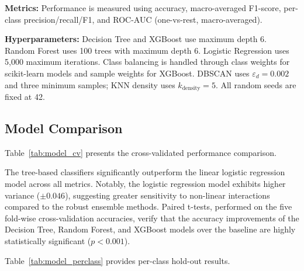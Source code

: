 \documentclass[conference]{IEEEtran}
\begin{document}
\textbf{Metrics:} Performance is measured using accuracy, macro-averaged F1-score, per-class precision/recall/F1, and ROC-AUC (one-vs-rest, macro-averaged).

\textbf{Hyperparameters:} Decision Tree and XGBoost use maximum depth 6. Random Forest uses 100 trees with maximum depth 6. Logistic Regression uses 5,000 maximum iterations. Class balancing is handled through class weights for scikit-learn models and sample weights for XGBoost. DBSCAN uses $\varepsilon_d=0.002$ and three minimum samples; KNN density uses $k_{\text{density}}=5$. All random seeds are fixed at 42.

\subsection{Model Comparison}

Table~\ref{tab:model_cv} presents the cross-validated performance comparison.

\begin{table}[t]
\centering
\caption{Model Performance --- 5-Fold Cross-Validation}
\label{tab:model_cv}
\end{table}

The tree-based classifiers significantly outperform the linear logistic regression model across all metrics. Notably, the logistic regression model exhibits higher variance ($\pm 0.046$), suggesting greater sensitivity to non-linear interactions compared to the robust ensemble methods. Paired t-tests, performed on the five fold-wise cross-validation accuracies, verify that the accuracy improvements of the Decision Tree, Random Forest, and XGBoost models over the baseline are highly statistically significant ($p < 0.001$).

Table~\ref{tab:model_perclass} provides per-class hold-out results.
\end{document}
